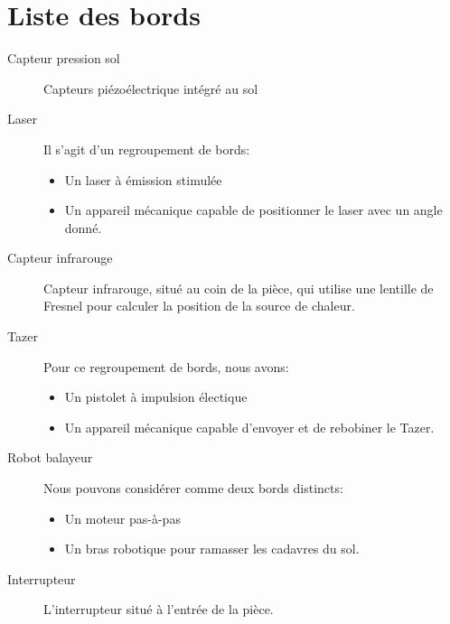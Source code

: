 \section {Liste des bords}

\begin{description}
	
	\item [Capteur pression sol]\el
		Capteurs piézoélectrique intégré au sol

	\item [Laser]\el
		Il s'agit d'un regroupement de bords:
		\begin{itemize}
		\item Un laser à émission stimulée
		\item Un appareil mécanique capable de positionner le laser
		avec un angle donné.
		\end{itemize}
	
	\item [Capteur infrarouge]\el
		Capteur infrarouge, situé au coin de la pièce, qui utilise une
		lentille de Fresnel pour calculer la position de la source de chaleur.
	
	\item [Tazer]\el	
		Pour ce regroupement de bords, nous avons:
		\begin{itemize}
		\item Un pistolet à impulsion électique
		\item Un appareil mécanique capable d'envoyer et de 
			rebobiner le Tazer.
		\end{itemize}
	
	\item [Robot balayeur]\el
		Nous pouvons considérer comme deux bords distincts:
		\begin{itemize}
		\item Un moteur pas-à-pas
		\item Un bras robotique pour ramasser les cadavres du sol.
		\end{itemize}

	\item [Interrupteur]\el
		L'interrupteur situé à l'entrée de la pièce.

\end{description}

\vfill
\pagebreak
